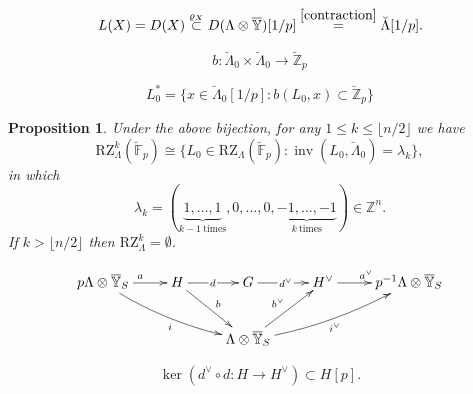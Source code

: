\documentclass[10pt,a4paper]{amsart}
\newtheorem{proposition}{Proposition}
\newcommand{\F}{\mathbb F}
\newcommand{\Z}{\mathbb Z}
\DeclareMathOperator{\inv}{inv}
\newcommand{\iso}{\cong}
\begin{document}
\begin{equation}\label{Ldef}
 L(X) = D(X)  \stackrel{\varrho_X}{\subset} D(\Lambda \otimes \overline{\mathbb{Y}}) [1/p]
 \stackrel{ \eqref{contraction}} {=} \breve{\Lambda}[1/p] . 
 \end{equation}

\begin{equation}\label{twisted pairing}
b   : \breve{\Lambda}_0  \times \breve{\Lambda}_0 \to \breve{\Z}_p
\end{equation}

\begin{equation}\label{right dual}
L_0^* = \{ x \in  \breve{\Lambda}_0[1/p] :  b(   L_0, x ) \subset \breve{\Z}_p \}
\end{equation}

 \begin{proposition}\label{prop:strata points}
 Under the above bijection,  for any $1\le k \le \lfloor n/2\rfloor$ we have
    \[
\mathrm{RZ}_\Lambda^k( \breve{\F}_p) 
\iso  
\{ L_0  \in \mathrm{RZ}_\Lambda( \breve{\F}_p) : 
\inv(L_0 , \breve{\Lambda}_0) = \lambda_k \} ,
\]
in which 
\[
\lambda_k=( \underbrace{1,\ldots, 1}_{k-1\mathrm{\ times}}, 0,\ldots, 0 , \underbrace{-1,\ldots, -1}_{k\mathrm{\ times}} ) \in \Z^n.
\]
If $k>\lfloor n/2\rfloor$ then $\mathrm{RZ}_\Lambda^k = \emptyset$.
\end{proposition}

\begin{equation}\label{Y tilde functor}
\xymatrix{
{p\Lambda \otimes \overline{\mathbb{Y}}_S  }\ar[r]^a    \ar@/_/[drr]_i  &  { H }  \ar[dr]^b  \ar[r]|{\, d\, }  &  {G}  \ar[r] | {\, d^\vee\, } & {H^\vee}  \ar[r]^{a^\vee}  & {p^{-1}\Lambda \otimes  \overline{\mathbb{Y}}_S  } \\
& &  { \Lambda \otimes  \overline{\mathbb{Y} }_S } \ar[ur]^{b^\vee} \ar@/_/[urr]_{i^\vee}
}
\end{equation}

\begin{equation}\label{Hpol}
\ker(  d^\vee \circ d : H \to H^\vee ) \subset H[p].
\end{equation}
\end{document}
